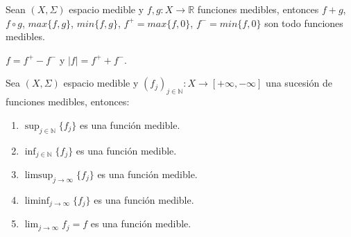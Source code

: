\begin{corolario}
    Sean $(X, \Sigma)$ espacio medible y $f, g: X \to \mathbb{R}$ funciones medibles, entonces $f + g$, $f \circ g$, $max\{f, g\}$, $min\{f, g\}$, $f^+=max\{f, 0\}$, $f^- = min\{f, 0\}$ son todo funciones medibles.
\end{corolario}
\begin{observación}
$f = f^+ - f^-$ y $|f| = f^+ + f^-.$
\end{observación}
\begin{teorema}
    Sea $(X, \Sigma)$ espacio medible y $(f_j)_{j \in \mathbb{N}}: X \to [+\infty, -\infty]$ una sucesión de funciones medibles, entonces:
    \vspace{-0.5em}
    \begin{enumerate}
        \item $\sup_{j \in \mathbb{N}}\{f_j\}$ es una función medible.
        \item $\inf_{j \in \mathbb{N}}\{f_j\}$ es una función medible.
        \item $\limsup_{j \to \infty}\{f_j\}$ es una función medible.
        \item $\liminf_{j \to \infty}\{f_j\}$ es una función medible.
        \item $\lim_{j \to \infty}f_j = f$ es una función medible.
    \end{enumerate}
\end{teorema}
